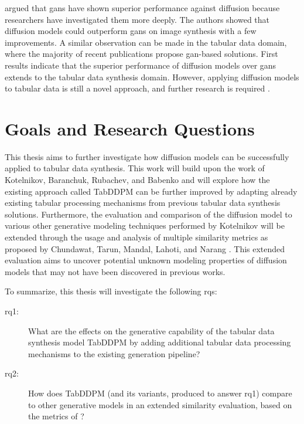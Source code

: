 \cite{dhariwal2021DiffusionModelsBeat} argued that \glspl{gan} have shown superior performance against diffusion because researchers have investigated them more deeply.
The authors showed that diffusion models could outperform \glspl{gan} on image synthesis with a few improvements.
A similar observation can be made in the tabular data domain, where the majority of recent publications propose \gls{gan}-based solutions.
First results \cite{kotelnikov2022TabDDPMModellingTabular} indicate that the superior performance of diffusion models over \glspl{gan} extends to the tabular data synthesis domain.
However, applying diffusion models to tabular data is still a novel approach, and further research is required \cite{borisov2022DeepNeuralNetworks}.


\section{Goals and Research Questions}
\label{ch:intro-goals}
This thesis aims to further investigate how diffusion models can be successfully applied to tabular data synthesis.
This work will build upon the work of Kotelnikov, Baranchuk, Rubachev, and Babenko \cite{kotelnikov2022TabDDPMModellingTabular} and will explore how the existing approach called TabDDPM can be further improved by adapting
already existing tabular processing mechanisms from previous tabular data synthesis solutions.
Furthermore, the evaluation and comparison of the diffusion model to various other generative modeling techniques performed by Kotelnikov \etal \cite{kotelnikov2022TabDDPMModellingTabular} will be extended through the usage and analysis
of multiple similarity metrics as proposed by Chundawat, Tarun, Mandal, Lahoti, and Narang \cite{chundawat2022UniversalMetricRobust}.
This extended evaluation aims to uncover potential unknown modeling properties of diffusion models that may not have been discovered in previous works.

To summarize, this thesis will investigate the following \glspl{rq}:

\begin{description}
	\item[\gls{rq}1:] What are the effects on the generative capability of the tabular data synthesis model TabDDPM by adding additional tabular data processing mechanisms to the existing generation pipeline?
	\item[\gls{rq}2:] How does TabDDPM (and its variants, produced to answer \gls{rq}1) compare to other generative models in an extended similarity evaluation, based on the metrics of \cite{chundawat2022UniversalMetricRobust}?
\end{description}

